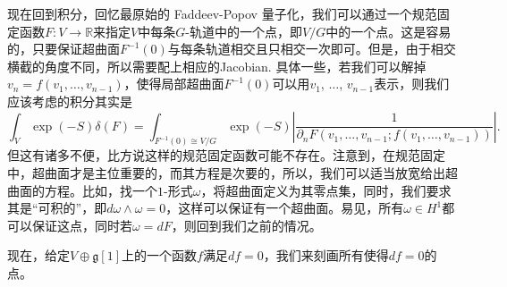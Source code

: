 \documentclass[12pt]{article}
\theoremstyle{definition}
\theoremstyle{plain}
\begin{document}
现在回到积分，回忆最原始的 Faddeev-Popov 量子化，我们可以通过一个规范固定函数$F:V\to \mathbb R$来指定$V$中每条$G$-轨道中的一个点，即$V/G$中的一个点。这是容易的，只要保证超曲面$F^{-1}(0)$与每条轨道相交且只相交一次即可。但是，由于相交横截的角度不同，所以需要配上相应的Jacobian. 具体一些，若我们可以解掉$v_n=f(v_1,\dots,v_{n-1})$，使得局部超曲面$F^{-1}(0)$可以用$v_1$, $\dots$, $v_{n-1}$表示，则我们应该考虑的积分其实是
\[
    \int_{V} \exp(-S)\delta(F)=\int_{F^{-1}(0)\cong V/G} \exp(-S)\left|\frac{1}{\partial_nF(v_1,\dots,v_{n-1};f(v_1,\dots,v_{n-1}))}\right|.
\]
但这有诸多不便，比方说这样的规范固定函数可能不存在。注意到，在规范固定中，超曲面才是主位重要的，而其方程是次要的，所以，我们可以适当放宽给出超曲面的方程。比如，找一个$1$-形式$\omega$，将超曲面定义为其零点集，同时，我们要求其是“可积的”，即$d\omega\wedge \omega=0$，这样可以保证有一个超曲面。易见，所有$\omega\in H^1$都可以保证这点，同时若$\omega=dF$，则回到我们之前的情况。

现在，给定$V\oplus \mathfrak g[1]$上的一个函数$f$满足$df=0$，我们来刻画所有使得$df=0$的点。
\end{document}
